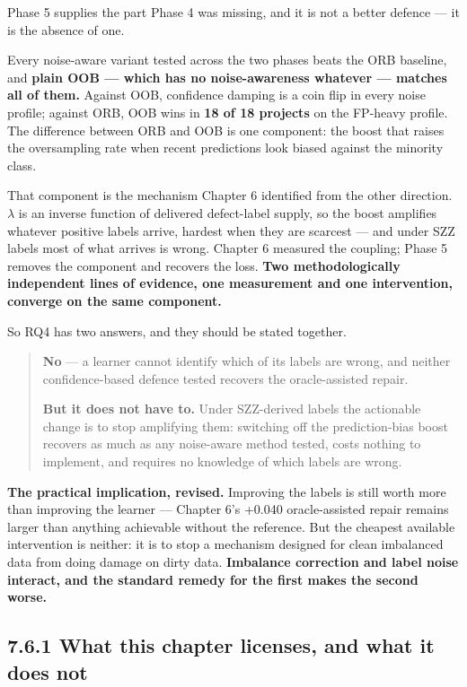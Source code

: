 Phase 5 supplies the part Phase 4 was missing, and it is not a better
defence --- it is the absence of one.

Every noise-aware variant tested across the two phases beats the ORB
baseline, and \textbf{plain OOB --- which has no noise-awareness
whatever --- matches all of them.} Against OOB, confidence damping is a
coin flip in every noise profile; against ORB, OOB wins in \textbf{18 of
18 projects} on the FP-heavy profile. The difference between ORB and OOB
is one component: the boost that raises the oversampling rate when
recent predictions look biased against the minority class.

That component is the mechanism Chapter 6 identified from the other
direction. \ensuremath{\lambda} is an inverse function of delivered defect-label supply, so
the boost amplifies whatever positive labels arrive, hardest when they
are scarcest --- and under SZZ labels most of what arrives is wrong.
Chapter 6 measured the coupling; Phase 5 removes the component and
recovers the loss. \textbf{Two methodologically independent lines of
evidence, one measurement and one intervention, converge on the same
component.}

So RQ4 has two answers, and they should be stated together.

\begin{quote}
\textbf{No} --- a learner cannot identify which of its labels are wrong,
and neither confidence-based defence tested recovers the oracle-assisted
repair.

\textbf{But it does not have to.} Under SZZ-derived labels the
actionable change is to stop amplifying them: switching off the
prediction-bias boost recovers as much as any noise-aware method tested,
costs nothing to implement, and requires no knowledge of which labels
are wrong.
\end{quote}

\textbf{The practical implication, revised.} Improving the labels is
still worth more than improving the learner --- Chapter 6's +0.040
oracle-assisted repair remains larger than anything achievable without
the reference. But the cheapest available intervention is neither: it is
to stop a mechanism designed for clean imbalanced data from doing damage
on dirty data. \textbf{Imbalance correction and label noise interact,
and the standard remedy for the first makes the second worse.}

\subsection{7.6.1 What this chapter licenses, and what it does
not}\label{what-this-chapter-licenses-and-what-it-does-not}

